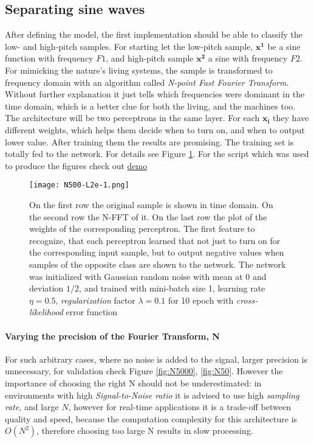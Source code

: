 \subsection{Separating sine waves}
After defining the model, the first implementation should be able to classify the low- and high-pitch samples. For starting let the low-pitch sample, $\mathbf{x^1}$ be a sine function with frequency $F1$, and high-pitch sample $\mathbf{x^2}$ a sine with frequency $F2$. For mimicking the nature's living systems, the sample is transformed to frequency domain with an algorithm called \emph{N-point Fast Fourier Transform}. Without further explanation it just tells which frequencies were dominant in the time domain, which is a better clue for both the living, and the machines too. The architecture will be two perceptrons in the same layer. For each $\mathbf{x_i}$ they have different weights, which helps them decide when to turn on, and when to output lower value. After training them the results are promising. The training set is totally fed to the network. For details see Figure \ref{fig:N500}. For the script which was used to produce the figures check out \href{https://github.com/botcs/deepvision/tree/master/demo/audio}{demo}

\begin{figure}
	\centering
	\texttt{[image: N500-L2e-1.png]}
	\caption{On the first row the original sample is shown in time domain. On the second row the N-FFT of it. On the last row the plot of the weights of the corresponding perceptron. The first feature to recognize, that each perceptron learned that not just to turn on for the corresponding input sample, but to output negative values when samples of the opposite class are shown to the network. The network was initialized with Gaussian random noise with mean at 0 and deviation $1/2$, and trained with mini-batch size 1, learning rate $\eta=0.5$, \emph{regularization} factor $\lambda=0.1$ for 10 epoch with \emph{cross-likelihood} error function}
	
	\label{fig:N500}
\end{figure}

\paragraph{Varying the precision of the Fourier Transform, N}
For such arbitrary cases, where no noise is added to the signal, larger precision is unnecessary, for validation check Figure \ref{fig:N5000}, \ref{fig:N50}. However the importance of choosing the right N should not be underestimated: in environments with high \emph{Signal-to-Noise ratio} it is advised to use high \emph{sampling rate}, and large $N$, however for real-time applications it is a trade-off between quality and speed, because the computation complexity for this architecture is $O(N^2)$, therefore choosing too large N results in slow processing.

